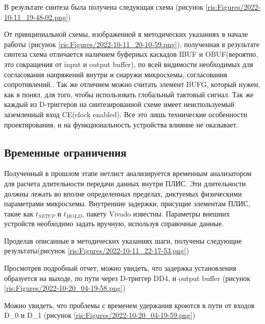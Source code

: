 \begin{sloppypar}
В результате синтеза была получена следующая схема (рисунок \ref{ris:Figures/2022-10-11_19-48-02.png})


От принципиальной схемы, изображенной в методических указаниях в начале работы (рисунок \ref{ris:Figures/2022-10-11_20-10-59.png}), полученная в результате синтеза схема отличается наличием буферных каскадов IBUF и OBUF(вероятно, это сокращения от input и output buffer), по всей видимости необходимых для согласования напряжений внутри и снаружи микросхемы, согласования сопротивлений.. Так же отличием можно считать элемент BUFG, который нужен, как я понял, для того, чтобы использовать глобальный тактовый сигнал. Так же каждый из D-триггеров на синтезированной схеме имеет неиспользуемый заземленный вход CE(clock enabled). Все это лишь технические особенности проектирования, и на функциональность устройства влияние не оказывает.
\newpage
\subsection{Временные ограничения} %

Полученный в прошлом этапе нетлист анализируется временным анализатором для расчета длительности передачи данных внутри ПЛИС. Эти длительности должны лежать во вполне определенных пределах, диктуемых физическими параметрами микросхемы. Внутренние задержки, присущие элементам ПЛИС, такие как \begin{math}t_{SETUP}\end{math}  и \begin{math}t_{HOLD}\end{math}, пакету Vivado известны. Параметры внешних устройств необходимо задать вручную, используя справочные данные.

Проделав описанные в методических указаниях шаги, получены следующие результаты(рисунок \ref{ris:Figures/2022-10-11_22-17-53.png})

Просмотрев подробный отчет, можно увидеть, что задержка установления образуется на выходе, по пути через D-триггер DD4, и output buffer (рисунок \ref{ris:Figures/2022-10-20_04-19-58.png})

Можно увидеть, что проблемы с временем удержания кроются в пути от входов D\_0 и D\_1 (рисунок \ref{ris:Figures/2022-10-20_04-19-59.png})


\end{sloppypar}
